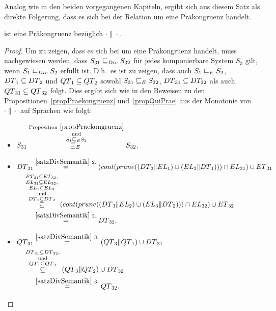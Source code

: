 Analog wie in den beiden vorgegangenen Kapiteln, ergibt sich aus diesem Satz
als direkte Folgerung, dass es sich bei der Relation \DRel{} um eine
Präkongruenz handelt.

\begin{prop}
\label{propDivPrae}
  \DRel{} ist eine Präkongruenz bezüglich $\cdot\|\cdot$.
\end{prop}

\begin{proof}
  Um zu zeigen, dass es sich bei \DRel{} um eine Präkongruenz handelt, muss
  nachgewiesen werden, dass $S_{31}\sqsubseteq _{Div}{} S_{32}$ für jedes komponierbare
  System $S_3$ gilt, wenn $S_1\sqsubseteq _{Div}{} S_2$ erfüllt ist.  D.h.\ es ist
  zu zeigen, dass auch $S_1\sqsubseteq _E{} S_2$, $DT{}_1\subseteq DT{}_2$ und
  $QT{}_1\subseteq QT{}_2$ sowohl $S_{31}\sqsubseteq _E{} S_{32}$,
  $DT{}_{31}\subseteq DT_{32}$ als auch $QT{}_{31}\subseteq QT{}_{32}$
  folgt. Dies ergibt sich wie in den Beweisen zu den
  Propositionen~\ref{propPraekongruenz} und~\ref{propQuiPrae} aus der Monotonie
  von $\cdot\|\cdot$ auf Sprachen wie folgt:
  \begin{itemize}
    \item $\begin{aligned}[t]
        S_{31}
        \overset{\mathrm{Proposition}~\ref{propPraekongruenz}}{%
        \overset{\mathrm{und}}{\overset{S_1\ERel{} S_2}{\ERel{}}}} S_{32},
    \end{aligned}$
    \item $\begin{aligned}[t]
        \DT{}_{31} &\overset{\ref{satzDivSemantik}~2.}{=}
        (\cont{}(\prune{}((\DT{}_3\|\EL{}_1) \cup (\EL{}_3\|\DT{}_1)))\cap
        \EL_{31}) \cup \ET{}_{31}\\
        &\hspace{-0.5cm}\overset{\ET{}_{31}\subseteq
      \ET{}_{32},}{\overset{\EL{}_{31}\subseteq
        \EL{}_{32},}{\overset{\EL{}_1\subseteq
      \EL{}_2}{\overset{\mathrm{und}}{\overset{\DT{}_1\subseteq
  \DT{}_2}{\subseteq}}}}} (\cont{}(\prune{}((\DT{}_3\|\EL{}_2) \cup
  (\EL{}_3\|\DT{}_2)))\cap \EL_{32}) \cup \ET{}_{32}\\
      &\overset{\ref{satzDivSemantik}~2.}{=} \DT{}_{32},
    \end{aligned}$
    \item $\begin{aligned}[t]
        \QT{}_{31} &\overset{\ref{satzDivSemantik}~3.}{=} (\QT{}_3\|\QT{}_1)
        \cup \DT{}_{31}\\
        &\hspace{-0.5cm}\overset{\DT{}_{31}\subseteq
      \DT{}_{32},}{\overset{\mathrm{und}}{\overset{\QT{}_1\subseteq
      \QT{}_2}{\subseteq}}} (\QT{}_3\|\QT{}_2) \cup \DT{}_{32}\\
      &\overset{\ref{satzDivSemantik}~3.}{=} \QT{}_{32}.
    \end{aligned}$
  \end{itemize}
\end{proof}

